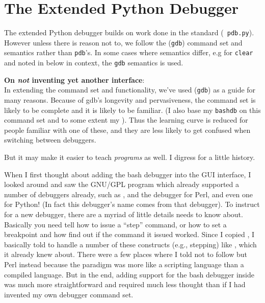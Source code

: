 

\chapter{The Extended Python Debugger \label{chapter-pydb}}

 

The extended Python debugger builds on work done in the standard
 ({\tt
pdb.py}). However unless there is reason not to, we follow the
 ({\tt gdb})
command set and semantics rather than {\tt pdb}'s. In some cases where
semantics differ, e.g for {\tt clear} and noted in below in context,
the {\tt gdb} semantics is used.

{\bf On \emph{not} inventing yet another interface}:\\ In extending
the command set and functionality, we've used  ({\tt gdb}) as a guide for
many reasons. Because of gdb's longevity and pervasiveness, the
command set is likely to be complete and it is likely to be familiar.
(I also base my  {\tt bashdb} on this command
set and to some extent my ). Thus the learning
curve is reduced for people familiar with one of these, and they are
less likely to get confused when switching between debuggers.

But it may make it easier to teach \emph{programs} as well. I digress for a
little history.

When I first thought about adding the bash debugger into the GUI
interface, I looked around and saw the GNU/GPL program
 which already supported a
number of debuggers already, such as , and the debugger for
Perl, and even one for Python! (In fact this debugger's name comes
from that debugger). To instruct  for a new debugger, there
are a myriad of little details  needs to know
about. Basically you need tell  how to issue a ``step''
command, or how to set a breakpoint and how find out if the command it
issued worked. Since I copied , I basically told 
to handle a number of these constructs (e.g., stepping) like
, which it already knew about. There were a few places where
I told  not to follow  but Perl instead because
the paradigm was more like a scripting language than a compiled
language. But in the end, adding support for the bash debugger inside
 was much more straightforward and required much less
thought than if I had invented my own debugger command set.

